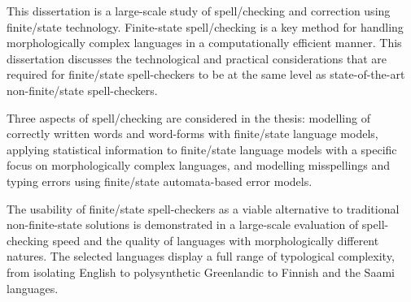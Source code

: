 This dissertation is a large-scale study of spell\-/checking and correction
using finite\-/state technology. Finite-state spell\-/checking is a key method
for handling morphologically complex languages in a computationally
efficient manner. This dissertation discusses the technological and practical
considerations that are required for finite\-/state spell-checkers to be at
the same level as state-of-the-art non-finite\-/state spell-checkers. 

Three aspects of spell\-/checking are considered in the thesis: modelling of
correctly written words and word-forms with finite\-/state language
models, applying statistical information to finite\-/state language models
with a specific focus on morphologically complex languages, and modelling
misspellings and typing errors using finite\-/state automata-based error
models.

The usability of finite\-/state spell-checkers as a viable alternative to
traditional non-finite-state solutions is demonstrated in a large-scale
evaluation of spell-checking speed and the quality of languages with
morphologically different natures. The selected languages display a
full range of typological complexity, from isolating English to 
polysynthetic Greenlandic to Finnish and the Saami languages.
